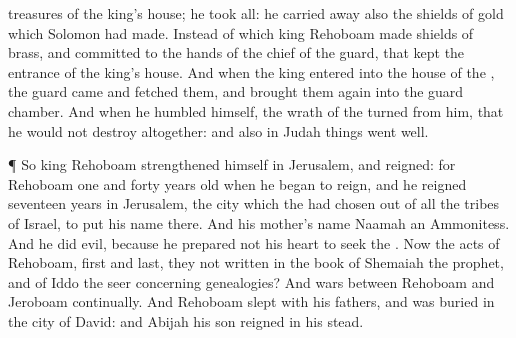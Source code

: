 {treasures of the
king’s
house; he
took all: he carried
away also the
shields of
gold which
Solomon had
made.
Instead of which
king
Rehoboam
made
shields of
brass, and
committed
{} to the
hands of the
chief of the
guard, that
kept the
entrance of the
king’s
house.
And
when the
king
entered into the
house of the
{}, the
guard
came and
fetched them, and brought them
again into the
guard
chamber.
And when he
humbled himself, the
wrath of the
{}
turned from him, that he would not
destroy
{}
altogether: and also in
Judah
things went
well.
\par }{\PP {}¶ So
king
Rehoboam
strengthened himself in
Jerusalem, and
reigned: for
Rehoboam
{}
one and
forty
years
old when he began to
reign, and he
reigned
seventeen
years in
Jerusalem, the
city which the
{} had
chosen out of all the
tribes of
Israel, to
put his
name there. And his
mother’s
name
{}
Naamah an
Ammonitess.
And he
did
evil, because he
prepared not his
heart to
seek the
{}.
Now the
acts of
Rehoboam,
first and
last,
{} they not
written in the
book of
Shemaiah the
prophet, and of
Iddo the
seer concerning
genealogies? And
{}
wars between
Rehoboam and
Jeroboam
continually.
And
Rehoboam
slept with his
fathers, and was
buried in the
city of
David: and
Abijah his
son
reigned in his stead.

}

